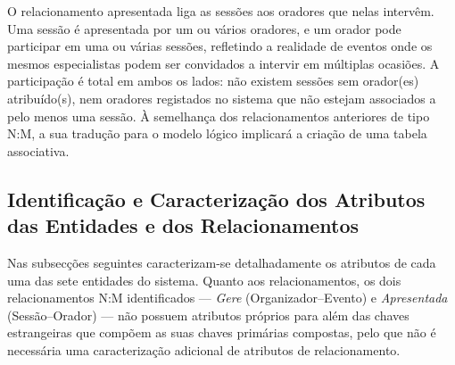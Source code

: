 \documentclass[runningheads]{llncs}
\begin{document}
                        O relacionamento apresentada liga as sessões aos oradores que nelas intervêm. Uma sessão é apresentada por um ou vários oradores, 
                        e um orador pode participar em uma ou várias sessões, refletindo a realidade de eventos onde os mesmos especialistas podem ser 
                        convidados a intervir em múltiplas ocasiões. A participação é total em ambos os lados: não existem sessões sem orador(es) atribuído(s), 
                        nem oradores registados no sistema que não estejam associados a pelo menos uma sessão. À semelhança dos relacionamentos anteriores de 
                        tipo N:M, a sua tradução para o modelo lógico implicará a criação de uma tabela associativa.
                    \vspace{0.4cm}
                
                \newpage
                \subsection{Identificação e Caracterização dos Atributos das Entidades e dos Relacionamentos}

                    Nas subsecções seguintes caracterizam-se detalhadamente os atributos de cada uma das sete entidades do sistema. Quanto aos relacionamentos, os dois relacionamentos N:M identificados — \textit{Gere} (Organizador–Evento) e \textit{Apresentada} (Sessão–Orador) — não possuem atributos próprios para além das chaves estrangeiras que compõem as suas chaves primárias compostas, pelo que não é necessária uma caracterização adicional de atributos de relacionamento.
\end{document}

